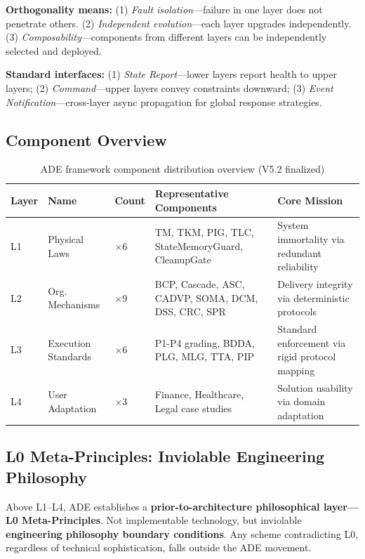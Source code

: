 \documentclass[11pt,a4paper]{article}
\begin{document}
\textbf{Orthogonality means:} (1) \emph{Fault isolation}---failure in one layer does not penetrate others. (2) \emph{Independent evolution}---each layer upgrades independently. (3) \emph{Composability}---components from different layers can be independently selected and deployed.

\textbf{Standard interfaces:} (1) \emph{State Report}---lower layers report health to upper layers; (2) \emph{Command}---upper layers convey constraints downward; (3) \emph{Event Notification}---cross-layer async propagation for global response strategies.

\subsection{Component Overview}
\label{sec:components}

\begin{table}[H]
\centering
\small
\begin{tabular}{p{}p{}p{}p{}p{}}
\toprule
\textbf{Layer} & \textbf{Name} & \textbf{Count} & \textbf{Representative Components} & \textbf{Core Mission} \\
\midrule
L1 & Physical Laws & $\times$6 & TM, TKM, PIG, TLC, StateMemoryGuard, CleanupGate & System immortality via redundant reliability \\
L2 & Org. Mechanisms & $\times$9 & BCP, Cascade, ASC, CADVP, SOMA, DCM, DSS, CRC, SPR & Delivery integrity via deterministic protocols \\
L3 & Execution Standards & $\times$6 & P1-P4 grading, BDDA, PLG, MLG, TTA, PIP & Standard enforcement via rigid protocol mapping \\
L4 & User Adaptation & $\times$3 & Finance, Healthcare, Legal case studies & Solution usability via domain adaptation \\
\bottomrule
\end{tabular}
\caption{ADE framework component distribution overview (V5.2 finalized)}
\label{tab:components}
\end{table}

\subsection{L0 Meta-Principles: Inviolable Engineering Philosophy}
\label{sec:l0}

Above L1--L4, ADE establishes a \textbf{prior-to-architecture philosophical layer---L0 Meta-Principles}. Not implementable technology, but inviolable \textbf{engineering philosophy boundary conditions}. Any scheme contradicting L0, regardless of technical sophistication, falls outside the ADE movement.
\end{document}
